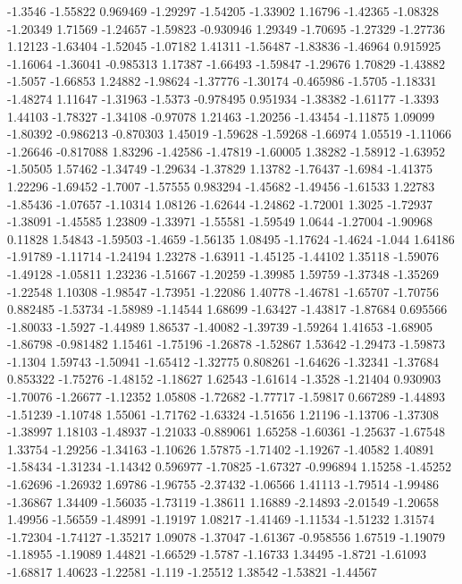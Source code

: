 \documentclass[9pt]{article}
\theoremstyle{plain}
\theoremstyle{definition}
\theoremstyle{remark}
\numberwithin{equation}{section}
\begin{document}
-1.3546
-1.55822
0.969469
-1.29297
-1.54205
-1.33902
1.16796
-1.42365
-1.08328
-1.20349
1.71569
-1.24657
-1.59823
-0.930946
1.29349
-1.70695
-1.27329
-1.27736
1.12123
-1.63404
-1.52045
-1.07182
1.41311
-1.56487
-1.83836
-1.46964
0.915925
-1.16064
-1.36041
-0.985313
1.17387
-1.66493
-1.59847
-1.29676
1.70829
-1.43882
-1.5057
-1.66853
1.24882
-1.98624
-1.37776
-1.30174
-0.465986
-1.5705
-1.18331
-1.48274
1.11647
-1.31963
-1.5373
-0.978495
0.951934
-1.38382
-1.61177
-1.3393
1.44103
-1.78327
-1.34108
-0.97078
1.21463
-1.20256
-1.43454
-1.11875
1.09099
-1.80392
-0.986213
-0.870303
1.45019
-1.59628
-1.59268
-1.66974
1.05519
-1.11066
-1.26646
-0.817088
1.83296
-1.42586
-1.47819
-1.60005
1.38282
-1.58912
-1.63952
-1.50505
1.57462
-1.34749
-1.29634
-1.37829
1.13782
-1.76437
-1.6984
-1.41375
1.22296
-1.69452
-1.7007
-1.57555
0.983294
-1.45682
-1.49456
-1.61533
1.22783
-1.85436
-1.07657
-1.10314
1.08126
-1.62644
-1.24862
-1.72001
1.3025
-1.72937
-1.38091
-1.45585
1.23809
-1.33971
-1.55581
-1.59549
1.0644
-1.27004
-1.90968
0.11828
1.54843
-1.59503
-1.4659
-1.56135
1.08495
-1.17624
-1.4624
-1.044
1.64186
-1.91789
-1.11714
-1.24194
1.23278
-1.63911
-1.45125
-1.44102
1.35118
-1.59076
-1.49128
-1.05811
1.23236
-1.51667
-1.20259
-1.39985
1.59759
-1.37348
-1.35269
-1.22548
1.10308
-1.98547
-1.73951
-1.22086
1.40778
-1.46781
-1.65707
-1.70756
0.882485
-1.53734
-1.58989
-1.14544
1.68699
-1.63427
-1.43817
-1.87684
0.695566
-1.80033
-1.5927
-1.44989
1.86537
-1.40082
-1.39739
-1.59264
1.41653
-1.68905
-1.86798
-0.981482
1.15461
-1.75196
-1.26878
-1.52867
1.53642
-1.29473
-1.59873
-1.1304
1.59743
-1.50941
-1.65412
-1.32775
0.808261
-1.64626
-1.32341
-1.37684
0.853322
-1.75276
-1.48152
-1.18627
1.62543
-1.61614
-1.3528
-1.21404
0.930903
-1.70076
-1.26677
-1.12352
1.05808
-1.72682
-1.77717
-1.59817
0.667289
-1.44893
-1.51239
-1.10748
1.55061
-1.71762
-1.63324
-1.51656
1.21196
-1.13706
-1.37308
-1.38997
1.18103
-1.48937
-1.21033
-0.889061
1.65258
-1.60361
-1.25637
-1.67548
1.33754
-1.29256
-1.34163
-1.10626
1.57875
-1.71402
-1.19267
-1.40582
1.40891
-1.58434
-1.31234
-1.14342
0.596977
-1.70825
-1.67327
-0.996894
1.15258
-1.45252
-1.62696
-1.26932
1.69786
-1.96755
-2.37432
-1.06566
1.41113
-1.79514
-1.99486
-1.36867
1.34409
-1.56035
-1.73119
-1.38611
1.16889
-2.14893
-2.01549
-1.20658
1.49956
-1.56559
-1.48991
-1.19197
1.08217
-1.41469
-1.11534
-1.51232
1.31574
-1.72304
-1.74127
-1.35217
1.09078
-1.37047
-1.61367
-0.958556
1.67519
-1.19079
-1.18955
-1.19089
1.44821
-1.66529
-1.5787
-1.16733
1.34495
-1.8721
-1.61093
-1.68817
1.40623
-1.22581
-1.119
-1.25512
1.38542
-1.53821
-1.44567
\end{document}
